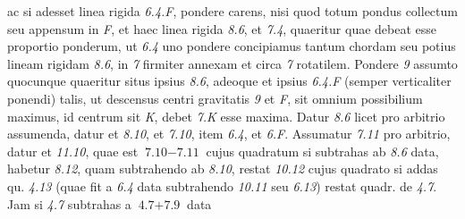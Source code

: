 ac si adesset linea rigida \textit{6.4.F}, pondere carens, nisi quod totum pondus collectum seu appensum in \textit{F}, et haec linea rigida 
\textit{8.6}, et \textit{7.4}, quaeritur quae debeat esse proportio ponderum, ut \textit{6.4} 
uno pondere concipiamus tantum chordam seu potius lineam rigidam \textit{8.6}, in \textit{7} firmiter annexam et circa \textit{7} rotatilem. Pondere 
\textit{9} assumto quocunque quaeritur situs ipsius \textit{8.6}, adeoque et ipsius \textit{6.4.F} (semper verticaliter ponendi) talis,
ut descensus centri gravitatis \textit{9} et \textit{F}, 
sit omnium possibilium maximus, id centrum sit \textit{K}, debet \textit{7.K} esse maxima. 
Datur \textit{8.6} licet pro arbitrio assumenda, datur et \textit{8.10}, et \textit{7.10}, item \textit{6.4}, et \textit{6.F}. 
\pend
\pstart
Assumatur \textit{7.11} pro arbitrio, datur et \textit{11.10}, quae est $\textit{7.10}-\textit{7.11}$ cujus quadratum si subtrahas ab \textit{8.6} data, habetur \textit{8.12}, quam subtrahendo ab \textit{8.10}, restat \textit{10.12} 
%
%
cujus quadrato si addas qu. \textit{4.13} (quae fit a \textit{6.4} data subtrahendo \textit{10.11} seu \textit{6.13}) restat quadr. de \textit{4.7}. Jam si \textit{4.7} subtrahas a $\textit{4.7}+\textit{7.9}$ data
